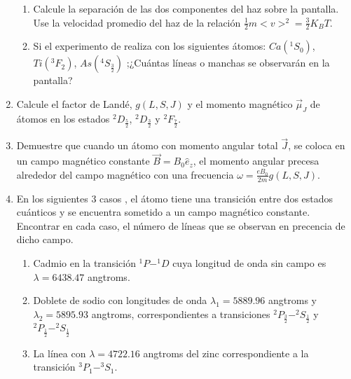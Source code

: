 \documentclass[]{article}
\begin{document}
\begin{enumerate}
  \begin{enumerate}
  \item Calcule la separación de las dos componentes del haz sobre la pantalla. Use la velocidad promedio del haz de la relación $\frac{1}{2}m<v>^2=\frac{3}{2}K_BT$.
  \item Si el experimento de realiza con los siguientes átomos: $Ca( ^1S_0)$, $Ti( ^3F_2)$, $As( ^4S_{\frac{3}{2}})$ ;¿Cuántas líneas  o manchas se observarán en la pantalla?
  \end{enumerate}
\item Calcule el factor  de Landé, $g(L,S,J)$ y el momento magnético $\vec{\mu}_J$ de átomos en los estados $^2D_{\frac{5}{2}}$, $^2D_{\frac{3}{2}}$ y $^2F_{\frac{7}{2}}$.
\item Demuestre que cuando un átomo con momento angular total $\vec{J}$, se coloca  en un campo magnético constante $\vec{B}=B_0\hat{e}_z$, el momento angular precesa alrededor del campo magnético con una frecuencia $\omega=\frac{eB_0}{2m}g(L,S,J)$.
\item En los siguientes $3$ casos , el átomo tiene una transición entre dos estados cuánticos y se encuentra sometido a un campo magnético constante. Encontrar en cada caso, el número de líneas  que se observan en precencia de dicho campo.
  \begin{enumerate}
  \item Cadmio en la transición $^1P-^1D$ cuya longitud de onda  sin campo es $\lambda=6438.47$ angtroms.
  \item Doblete de sodio con longitudes de onda $\lambda_1=5889.96$ angtroms y $\lambda_2=5895.93$ angtroms, correspondientes a transiciones  $^2P_{\frac{3}{2}}-^2S_{\frac{1}{2}}$ y $^2P_{\frac{1}{2}}-^2S_{\frac{1}{2}}$
  \item La línea con $\lambda=4722.16$ angtroms del zinc correspondiente a la transición $^3P_{1}-^3S_{1}$.
  \end{enumerate}

\end{enumerate}
\end{document}
